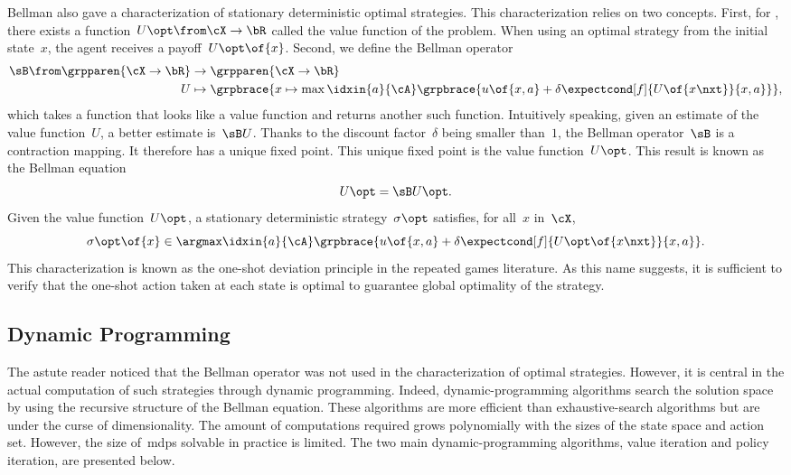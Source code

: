 Bellman also gave a characterization of stationary deterministic optimal strategies.
This characterization relies on two concepts.
First, for , there exists a function~\(U\opt \from \cX \to \bR\) called the value function of the problem.
When using an optimal strategy from the initial state~\(x\), the agent receives a payoff~\(U\opt \of {x}\).
Second, we define the Bellman operator
\begin{equation*}
\begin{aligned}
\sB \from \grpparen{\cX \to \bR} &\to \grpparen{\cX \to \bR} \\
U &\mapsto \grpbrace{x \mapsto \max\idxin{a}{\cA} \grpbrace{u \of{x, a} + \delta \expectcond[f]{U \of{x\nxt}}{x, a}}},
\end{aligned}
\end{equation*}
which takes a function that looks like a value function and returns another such function.
Intuitively speaking, given an estimate of the value function~\(U\), a better estimate is~\(\sB U\).
Thanks to the discount factor~\(\delta\) being smaller than~\(1\), the Bellman operator~\(\sB\) is a contraction mapping.
It therefore has a unique fixed point.
This unique fixed point is the value function~\(U\opt\).
This result is known as the Bellman equation
\begin{equation*}
U\opt = \sB U\opt.
\end{equation*}
Given the value function~\(U\opt\), a stationary deterministic strategy~\(\sigma\opt\) satisfies, for all~\(x\) in~\(\cX\),
\begin{equation*}
\sigma\opt \of{x} \in \argmax\idxin{a}{\cA} \grpbrace{ u\of{x,a} + \delta \expectcond[f]{U\opt \of{x\nxt}}{x,a}}.
\end{equation*}
This characterization is known as the one-shot deviation principle in the repeated games literature.
As this name suggests, it is sufficient to verify that the one-shot action taken at each state is optimal to guarantee global optimality of the strategy.

\subsection{Dynamic Programming}

The astute reader noticed that the Bellman operator was not used in the characterization of optimal strategies.
However, it is central in the actual computation of such strategies through dynamic programming.
Indeed, dynamic-programming algorithms search the solution space by using the recursive structure of the Bellman equation.
These algorithms are more efficient than exhaustive-search algorithms but are under the curse of dimensionality.
The amount of computations required grows polynomially with the sizes of the state space and action set.
However, the size of~\acp{mdp} solvable in practice is limited.
The two main dynamic-programming algorithms, value iteration and policy iteration, are presented below.

